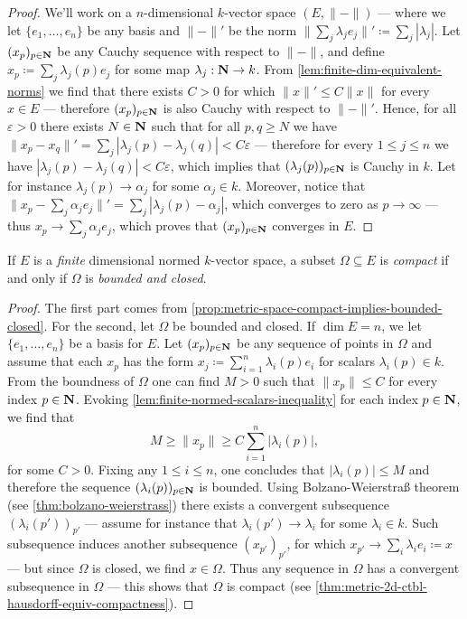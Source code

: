 \begin{proof}
We'll work on a \(n\)-dimensional \(k\)-vector space \((E, \| - \|)\) --- where
we let \(\{e_1, \dots, e_n\}\) be any basis and \(\| - \|'\) be the norm \(\|
\sum_j \lambda_j e_j \|' \coloneq \sum_j |\lambda_j|\). Let \((x_p)_{p \in \mathbf{N}}\)
be any Cauchy sequence with respect to \(\| - \|\), and define \(x_p \coloneq
\sum_j \lambda_j(p) e_j\) for some map \(\lambda_j: \mathbf{N} \to k\). From
\cref{lem:finite-dim-equivalent-norms} we find that there exists \(C > 0\) for
which \(\| x \|' \leq C \| x \|\) for every \(x \in E\) --- therefore \((x_p)_{p
\in \mathbf{N}}\) is also Cauchy with respect to \(\| - \|'\). Hence, for all
\(\varepsilon > 0\) there exists \(N \in \mathbf{N}\) such that for all \(p, q \geq N\)
we have \(\| x_p - x_q \|' = \sum_j |\lambda_j(p) - \lambda_j(q)| <
C \varepsilon\) --- therefore for every \(1 \leq j \leq n\) we have
\(|\lambda_j(p) - \lambda_j(q)| < C \varepsilon\), which implies that
\((\lambda_j(p))_{p \in \mathbf{N}}\) is Cauchy in \(k\). Let for instance
\(\lambda_j(p) \to \alpha_j\) for some \(\alpha_j \in k\). Moreover, notice that
\(\| x_p - \sum_j \alpha_j e_j\|' = \sum_j |\lambda_j(p) - \alpha_j|\), which
converges to zero as \(p \to \infty\) --- thus \(x_p \to \sum_j \alpha_j e_j\),
which proves that \((x_p)_{p \in \mathbf{N}}\) converges in \(E\).
\end{proof}

\begin{proposition}
\label{prop:compact-on-normed-space}
If \(E\) is a \emph{finite} dimensional normed \(k\)-vector space, a subset
\(\Omega \subseteq E\) is \emph{compact} if and only if \(\Omega\) is
\emph{bounded and closed}.
\end{proposition}

\begin{proof}
The first part comes from
\cref{prop:metric-space-compact-implies-bounded-closed}. For the second, let
\(\Omega\) be bounded and closed. If \(\dim E = n\), we let
\(\{e_1, \dots, e_n\}\) be a basis for \(E\). Let \((x_p)_{p \in \mathbf{N}}\) be any
sequence of points in \(\Omega\) and assume that each \(x_p\) has the form
\(x_j\coloneq \sum_{i=1}^n \lambda_i(p) e_i\) for scalars
\(\lambda_i(p) \in k\). From the boundness of \(\Omega\) one can find \(M > 0\)
such that \(\| x_p \| \leq C\) for every index \(p \in \mathbf{N}\). Evoking
\cref{lem:finite-normed-scalars-inequality} for each index \(p \in \mathbf{N}\), we find
that
\[
M \geq \| x_p \| \geq C \sum_{i=1}^n |\lambda_i(p)|,
\]
for some \(C > 0\). Fixing any \(1 \leq i \leq n\), one concludes that
\(|\lambda_i(p)| \leq M\) and therefore the sequence \((\lambda_i(p))_{p \in
\mathbf{N}}\) is bounded. Using Bolzano-Weierstra{\ss} theorem (see
\cref{thm:bolzano-weierstrass}) there exists a convergent subsequence
\((\lambda_i(p'))_{p'}\) --- assume for instance that \(\lambda_i(p') \to
\lambda_i\) for some \(\lambda_i \in k\). Such subsequence induces another
subsequence \((x_{p'})_{p'}\), for which \(x_{p'} \to \sum_i \lambda_i e_i
\coloneq x\) --- but since \(\Omega\) is closed, we find \(x \in \Omega\). Thus
any sequence in \(\Omega\) has a convergent subsequence in \(\Omega\) --- this
shows that \(\Omega\) is compact (see
\cref{thm:metric-2d-ctbl-hausdorff-equiv-compactness}).
\end{proof}

